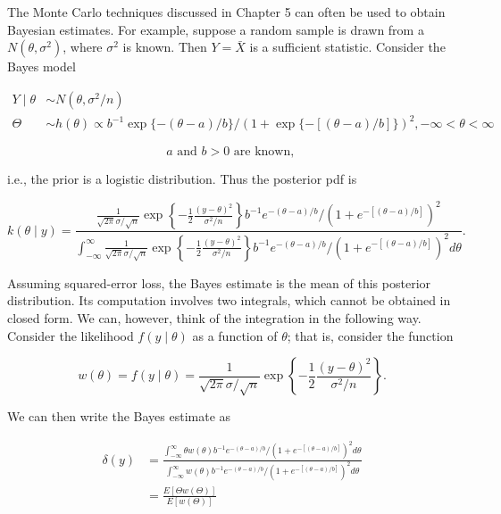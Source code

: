 The Monte Carlo techniques discussed in Chapter 5 can often be used to obtain Bayesian estimates. For example, suppose a random sample is drawn from a\\
$N\left(\theta, \sigma^{2}\right)$, where $\sigma^{2}$ is known. Then $Y=\bar{X}$ is a sufficient statistic. Consider the Bayes model

$$
\begin{aligned}
Y \mid \theta & \sim N\left(\theta, \sigma^{2} / n\right) \\
\Theta & \sim h(\theta) \propto b^{-1} \exp \{-(\theta-a) / b\} /(1+\exp \{-[(\theta-a) / b]\})^{2},-\infty<\theta<\infty
\end{aligned}
$$


\begin{equation*}
a \text { and } b>0 \text { are known, } \tag{11.3.1}
\end{equation*}


i.e., the prior is a logistic distribution. Thus the posterior pdf is

$$
k(\theta \mid y)=\frac{\frac{1}{\sqrt{2 \pi} \sigma / \sqrt{n}} \exp \left\{-\frac{1}{2} \frac{(y-\theta)^{2}}{\sigma^{2} / n}\right\} b^{-1} e^{-(\theta-a) / b} /\left(1+e^{-[(\theta-a) / b]}\right)^{2}}{\int_{-\infty}^{\infty} \frac{1}{\sqrt{2 \pi} \sigma / \sqrt{n}} \exp \left\{-\frac{1}{2} \frac{(y-\theta)^{2}}{\sigma^{2} / n}\right\} b^{-1} e^{-(\theta-a) / b} /\left(1+e^{-[(\theta-a) / b]}\right)^{2} d \theta} .
$$

Assuming squared-error loss, the Bayes estimate is the mean of this posterior distribution. Its computation involves two integrals, which cannot be obtained in closed form. We can, however, think of the integration in the following way. Consider the likelihood $f(y \mid \theta)$ as a function of $\theta$; that is, consider the function

$$
w(\theta)=f(y \mid \theta)=\frac{1}{\sqrt{2 \pi} \sigma / \sqrt{n}} \exp \left\{-\frac{1}{2} \frac{(y-\theta)^{2}}{\sigma^{2} / n}\right\} .
$$

We can then write the Bayes estimate as


\begin{align*}
\delta(y) & =\frac{\int_{-\infty}^{\infty} \theta w(\theta) b^{-1} e^{-(\theta-a) / b} /\left(1+e^{-[(\theta-a) / b]}\right)^{2} d \theta}{\int_{-\infty}^{\infty} w(\theta) b^{-1} e^{-(\theta-a) / b} /\left(1+e^{-[(\theta-a) / b]}\right)^{2} d \theta} \\
& =\frac{E[\Theta w(\Theta)]}{E[w(\Theta)]} \tag{11.3.2}
\end{align*}


